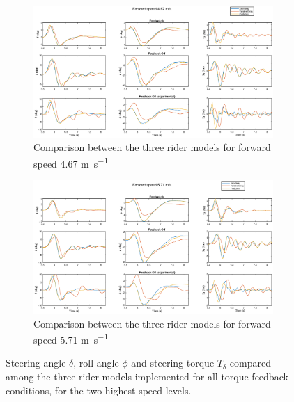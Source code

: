      \begin{figure}
        \centering
        \begin{subfigure}[b]{\textwidth}
            \centering
            \includegraphics[width=1\linewidth]{images/compare_models3.eps}
            \caption{Comparison between the three rider models for forward speed 4.67 \si{\meter\per\second}}
            \label{fig:results_compare3}
        \end{subfigure}
        \begin{subfigure}[b]{\textwidth}
            \centering
            \includegraphics[width=1\linewidth]{images/compare_models4.eps}
            \caption{Comparison between the three rider models for forward speed 5.71 \si{\meter\per\second}}            
            \label{fig:results_compare4}
        \end{subfigure}
        \caption{Steering angle \ensuremath{\delta}, roll angle \ensuremath{\phi} and steering torque \ensuremath{T_\delta} compared among the three rider models implemented for all torque feedback conditions, for the two highest speed levels.}
        \label{fig:results_compare34}
     \end{figure}

